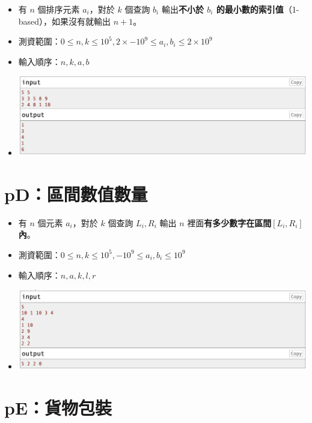 \documentclass[12pt]{article}
\begin{document}
\begin{itemize}[label={}, itemsep=0pt]
    \item 有 $n$ 個排序元素 $a_i$，對於 $k$ 個查詢 $b_i$ 輸出\textbf{不小於 $b_i$ 的最小數的索引值}（1-based），如果沒有就輸出 $n+1$。
    \item 測資範圍：$0 \leq n, k \leq 10^5, 2 \times -10^9 \leq a_i, b_i \leq 2 \times 10^9$
    \item 輸入順序：$n, k, a, b$
    \item \includegraphics[width=15.0cm]{img/pC.png}
\end{itemize}

\section*{pD：區間數值數量}

\begin{itemize}[label={}, itemsep=0pt]
    \item 有 $n$ 個元素 $a_i$，對於 $k$ 個查詢 $L_i, R_i$ 輸出 $n$ 裡面\textbf{有多少數字在區間$[L_i, R_i]$內}。
    \item 測資範圍：$0 \leq n, k \leq 10^5, -10^9 \leq a_i, b_i \leq 10^9$
    \item 輸入順序：$n, a, k, l, r$
    \item \includegraphics[width=15.0cm]{img/pD.png}
\end{itemize}

\section*{pE：貨物包裝}
\end{document}
